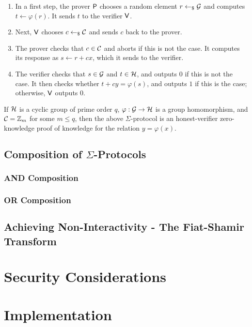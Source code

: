 \documentclass[runningheads]{llncs}
\begin{document}
\begin{enumerate}
  \item
    In a first step, the prover $\mathsf{P}$ chooses a random element $r\gets_{\$}\mathcal{G}$ and computes $t\gets\varphi(r)$.
	It sends $t$ to the verifier $\mathsf{V}$.
  \item
    Next, $\mathsf{V}$ chooses $c\gets_{\$}\mathcal{C}$ and sends $c$ back to the prover.
  \item
    The prover checks that $c\in\mathcal{C}$ and aborts if this is not the case.
	It computes its response as $s\gets r+cx$, which it sends to the verifier.
  \item
    The verifier checks that $s\in\mathcal{G}$ and $t\in\mathcal{H}$, and outputs $0$ if this is not the case.
	It then checks whether $t + cy = \varphi(s)$, and outputs $1$ if this is the case; otherwise, $\mathsf{V}$ outputs $0$.
\end{enumerate}

\begin{theorem}
  If $\mathcal{H}$ is a cyclic group of prime order $q$, $\varphi:\mathcal{G}\to\mathcal{H}$ is a group homomorphism, and $\mathcal{C}=\mathbb{Z}_m$ for some $m\leq q$, then the above $\Sigma$-protocol is an honest-verifier zero-knowledge proof of knowledge for the relation $y=\varphi(x)$.
\end{theorem}

\subsection{Composition of $\Sigma$-Protocols}
\subsubsection{AND Composition}

\subsubsection{OR Composition}

\subsection{Achieving Non-Interactivity - The Fiat-Shamir Transform}


\section{Security Considerations}

\section{Implementation}



%
\end{document}
